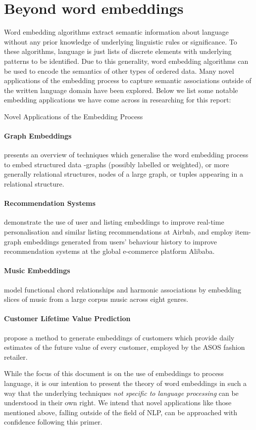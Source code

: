 \documentclass{ucetd}
\begin{document}
\section{Beyond word embeddings}\label{chap:beyond-word-embeddings}
Word embedding algorithms extract semantic information about language without any prior knowledge of underlying linguistic rules or significance. To these algorithms, language is just lists of discrete elements with underlying patterns to be identified. Due to this generality, word embedding algorithms can be used to encode the semantics of other types of ordered data.
Many novel applications of the embedding process to capture semantic associations outside of the written language domain have been explored. Below we list some notable embedding applications we have come across in researching for this report:
\par
\begin{infobox}{Novel Applications of the Embedding Process}
  \paragraph{Graph Embeddings} \textcite{grohe20-word2-node2} presents an overview of techniques which generalise the word embedding process to embed structured data -graphs (possibly labelled or weighted), or more generally relational structures, nodes of a large graph, or tuples appearing in a relational structure.
  \paragraph{Recommendation Systems} \textcite{grbovic-2018-real-time-personalization} demonstrate the use of user and listing embeddings to improve real-time personalisation and similar listing recommendations at Airbnb, and \textcite{wang-2018-billion-scale-commodity-embedding} employ item-graph embeddings generated from users' behaviour history to improve recommendation systems at the global e-commerce platform Alibaba.
  \paragraph{Music Embeddings} \textcite{chuan-2018-from-context-to} model functional chord relationships and harmonic associations by embedding slices of music from a large corpus music across eight genres.
  \paragraph{Customer Lifetime Value Prediction} \textcite{chamberlain17-custom-lifet-value-predic-using-embed} propose a method to generate embeddings of customers which provide daily estimates of the future value of every customer, employed by the ASOS fashion retailer.
\end{infobox}
While the focus of this document is on the use of embeddings to process language, it is our intention to present the theory of word embeddings in such a way that the underlying techniques \emph{not specific to language processing} can be understood in their own right. We intend that novel applications like those mentioned above, falling outside of the field of NLP, can be approached with confidence following this primer.
\end{document}
